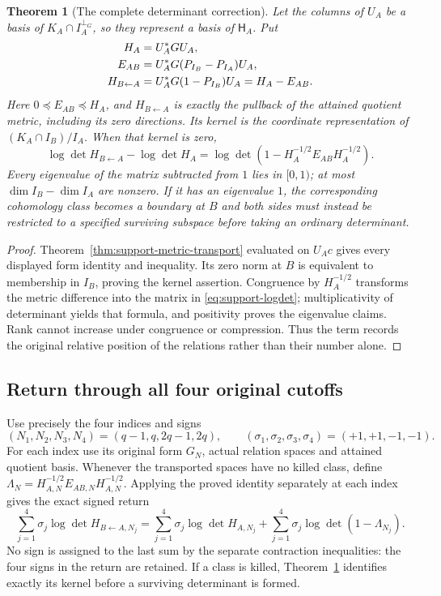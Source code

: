\documentclass[11pt,a4paper]{article}
\newtheorem{theorem}{Theorem}[section]
\theoremstyle{definition}\newtheorem{definition}[theorem]{Definition}
\begin{document}
\begin{theorem}[The complete determinant correction]\label{thm:support-det-correction}
Let the columns of $U_A$ be a basis of $K_A\cap I_A^{\perp_G}$, so they represent a basis of $\mathsf H_A$. Put
\begin{align}
 H_A&=U_A^*GU_A,\notag\\
 E_{AB}&=U_A^*G(P_{I_B}-P_{I_A})U_A,\notag\\
 H_{B\leftarrow A}&=U_A^*G(1-P_{I_B})U_A=H_A-E_{AB}.
 \label{eq:support-metric-matrices}
\end{align}
Here $0\preceq E_{AB}\preceq H_A$, and $H_{B\leftarrow A}$ is exactly the pullback of the attained quotient metric, including its zero directions. Its kernel is the coordinate representation of $(K_A\cap I_B)/I_A$. When that kernel is zero,
\begin{equation}\label{eq:support-logdet}
 \log\det H_{B\leftarrow A}-\log\det H_A
 =\log\det\left(1-H_A^{-1/2}E_{AB}H_A^{-1/2}\right).
\end{equation}
Every eigenvalue of the matrix subtracted from $1$ lies in $[0,1)$; at most $\dim I_B-\dim I_A$ are nonzero. If it has an eigenvalue $1$, the corresponding cohomology class becomes a boundary at $B$ and both sides must instead be restricted to a specified surviving subspace before taking an ordinary determinant.
\end{theorem}
\begin{proof}
Theorem~\ref{thm:support-metric-transport} evaluated on $U_Ac$ gives every displayed form identity and inequality. Its zero norm at $B$ is equivalent to membership in $I_B$, proving the kernel assertion. Congruence by $H_A^{-1/2}$ transforms the metric difference into the matrix in \eqref{eq:support-logdet}; multiplicativity of determinant yields that formula, and positivity proves the eigenvalue claims. Rank cannot increase under congruence or compression. Thus the term records the original relative position of the relations rather than their number alone.
\end{proof}

\subsection{Return through all four original cutoffs}
Use precisely the four indices and signs
\[
 (N_1,N_2,N_3,N_4)=(q-1,q,2q-1,2q),\qquad
 (\sigma_1,\sigma_2,\sigma_3,\sigma_4)=(+1,+1,-1,-1).
\]
For each index use its original form $G_N$, actual relation spaces and attained quotient basis. Whenever the transported spaces have no killed class, define
$\Lambda_N=H_{A,N}^{-1/2}E_{AB,N}H_{A,N}^{-1/2}$. Applying the proved identity separately at each index gives the exact signed return
\begin{equation}\label{eq:all-four-support-return}
 \sum_{j=1}^4\sigma_j\log\det H_{B\leftarrow A,N_j}
 =\sum_{j=1}^4\sigma_j\log\det H_{A,N_j}
  +\sum_{j=1}^4\sigma_j\log\det(1-\Lambda_{N_j}).
\end{equation}
No sign is assigned to the last sum by the separate contraction inequalities: the four signs in the return are retained. If a class is killed, Theorem~\ref{thm:support-det-correction} identifies exactly its kernel before a surviving determinant is formed.
\end{document}
